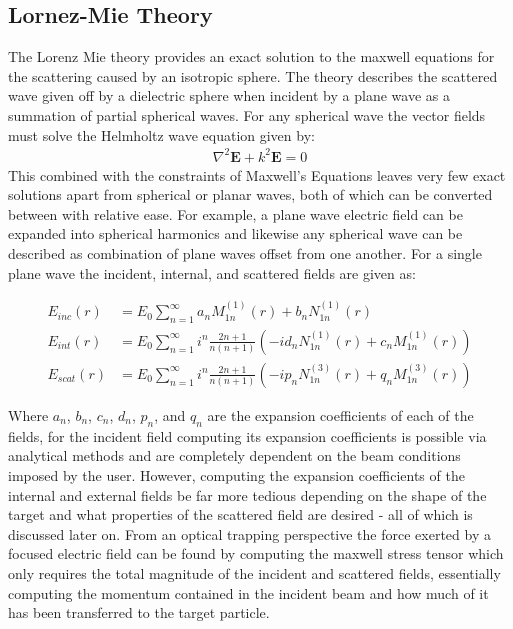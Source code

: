 \subsection{Lornez-Mie Theory}
The Lorenz Mie theory provides an exact solution to the maxwell equations for the scattering caused by an isotropic sphere. The theory describes the scattered wave given off by a dielectric sphere when incident by a plane wave as a summation of partial spherical waves. For any spherical wave the vector fields must solve the Helmholtz wave equation given by:
\begin{align}
	\nabla^2\mathbf{E} +k^2\mathbf{E} = 0
\end{align} 
This combined with the constraints of Maxwell's Equations leaves very few exact solutions apart from spherical or planar waves, both of which can be converted between with relative ease. For example, a plane wave electric field can be expanded into spherical harmonics and likewise any spherical wave can be described as combination of plane waves offset from one another. For a single plane wave the incident, internal, and scattered fields are given as:

\begin{align}
	E_{inc}(r) &= E_0 \sum_{n=1}^\infty a_{n}M_{1n}^{(1)}(r)+b_{n}N_{1n}^{(1)}(r) \\
	E_{int}(r) &= E_0 \sum_{n=1}^\infty i^n\frac{2n+1}{n(n+1)}\left(-id_{n}N_{1n}^{(1)}(r)+c_{n}M_{1n}^{(1)}(r)\right) \\
	E_{scat}(r) &= E_0 \sum_{n=1}^\infty  i^n\frac{2n+1}{n(n+1)}\left(-ip_{n}N_{1n}^{(3)}(r)+q_{n}M_{1n}^{(3)}(r)\right)
\end{align}

Where $a_n$, $b_n$, $c_n$, $d_n$, $p_n$, and $q_n$ are the expansion coefficients of each of the fields, for the incident field computing its expansion coefficients is possible via analytical methods and are completely dependent on the beam conditions imposed by the user. However, computing the expansion coefficients of the internal and external fields be far more tedious depending on the shape of the target and what properties of the scattered field are desired - all of which is discussed later on. From an optical trapping perspective the force exerted by a focused electric field can be found by computing the maxwell stress tensor which only requires the total magnitude of the incident and scattered fields, essentially computing the momentum contained in the incident beam and how much of it has been transferred to the target particle. 

